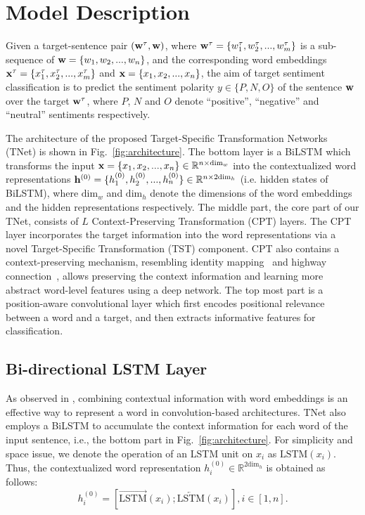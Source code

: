 \documentclass[11pt,a4paper]{article}
\begin{document}
\section{Model Description}
Given a target-sentence pair $(\mathrm{\bf w}^ \tau,\mathrm{\bf w})$, where $\mathrm{\bf w}^\tau = \{w^{\tau}_1,  w^{\tau}_2, ..., w^{\tau}_m\}$ is a sub-sequence of $\mathrm{\bf w}= \{w_1,  w_2, ..., w_n\}$, and the corresponding word embeddings $\mathrm{\bf x}^{\tau}=\{x^{\tau}_1, x^{\tau}_2,..., x^{\tau}_m\}$ and $\mathrm{\bf x}=\{x_1, x_2,..., x_n\}$, the aim of target sentiment classification is to predict the sentiment polarity $y \in \{P, N, O\}$ of the sentence $\mathrm{\bf w}$ over the target $\mathrm{\bf w}^{\tau}$, where $P$, $N$ and $O$ denote ``positive'', ``negative'' and ``neutral'' sentiments respectively.

The architecture of the proposed Target-Specific Transformation Networks (TNet) is shown in Fig.~\ref{fig:architecture}. The bottom layer is a BiLSTM which transforms the input $\mathrm{\bf x}=\{x_1, x_2,..., x_n\} \in \mathbb{R}^{n \times \mathrm{dim}_w}$ into the contextualized word representations $\mathrm{\bf h}^{(0)}=\{h^{(0)}_1, h^{(0)}_2,..., h^{(0)}_n\} \in \mathbb{R}^{n \times 2\mathrm{dim}_h}$ (i.e. hidden states of BiLSTM), where $\mathrm{dim}_w$ and $\mathrm{dim}_h$ denote the dimensions of the word embeddings and the hidden representations respectively. The middle part, the core part of our TNet, consists of $L$ Context-Preserving Transformation (CPT) layers. The CPT layer incorporates the target information into the word representations via a novel Target-Specific Transformation (TST) component. CPT also contains a context-preserving mechanism, resembling identity mapping~\cite{he2016deep,he2016identity} and highway connection~\cite{srivastava2015training,srivastava2015highway}, allows preserving the context information and learning more abstract word-level features using a deep network. The top most part is a position-aware convolutional layer which first encodes positional relevance between a word and a target, and then extracts informative features for classification.

\subsection{Bi-directional LSTM Layer}
\label{sec:2.2}
As observed in \citet{lai2015recurrent}, combining contextual information with word embeddings is an effective way to represent a word in convolution-based architectures. 
TNet also employs a BiLSTM to accumulate the context information for each word of the input sentence, i.e., the bottom part in Fig.~\ref{fig:architecture}. 
For simplicity and space issue, we denote the operation of an LSTM unit on $x_i$ as $\text{LSTM}(x_i)$.
Thus, the contextualized word representation $h^{(0)}_i \in \mathbb{R}^{2\mathrm{dim}_h}$ is obtained as follows:
\begin{equation}
h^{(0)}_i = [\overrightarrow{\text{LSTM}}(x_i); \overleftarrow{\text{LSTM}}(x_i)], i \in [1, n].
\end{equation}
\end{document}
